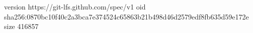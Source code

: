 version https://git-lfs.github.com/spec/v1
oid sha256:0870bc10f40c2a3bca7e374524c65863b21b498d46d2579edf8fb635d59e172e
size 416857

